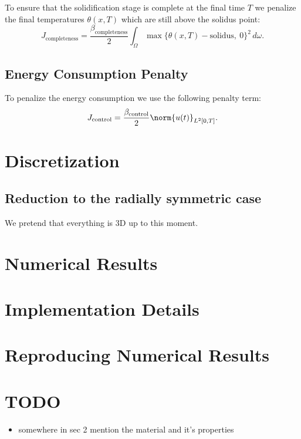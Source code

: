 To ensure that the solidification stage is complete at the final time $T$ we penalize the final temperatures $\theta(x, T)$ which are still above the solidus point:
\begin{equation}
	J_{\text{completeness}} =
	\frac{\beta_\text{completeness}}{2} \int_{\Omega} \max\{ \theta(x, T) - \text{solidus},\ 0 \}^2\, d\omega.
\end{equation}

\subsection{Energy Consumption Penalty}

To penalize the energy consumption we use the following penalty term:
\begin{equation}
	J_{\text{control}} =
	\frac{\beta_\text{control}}{2} \norm{u(t)}_{L^2[0,T]}.
\end{equation}



\section{Discretization}
\label{sec:discretization}

\subsection{Reduction to the radially symmetric case}

{\color{TolHighContrastBlue}
We pretend that everything is 3D up to this moment.
}


\section{Numerical Results}
\label{sec:numerical_results}

\appendix

\section{Implementation Details}

\section{Reproducing Numerical Results}


\section{TODO}

\begin{itemize}
	\item somewhere in sec 2 mention the material and it's properties
\end{itemize}